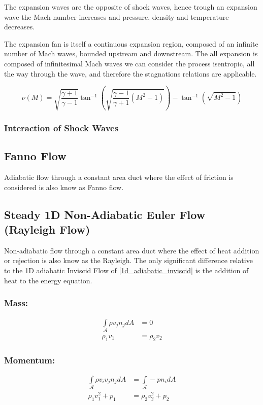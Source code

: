 The expansion waves are the opposite of shock waves, hence trough an expansion wave the Mach number increases and pressure, density and temperature decreases.

The expansion fan is itself a continuous expansion region, composed of an infinite number of Mach waves, bounded upstream and downstream.
The all expansion is composed of infinitesimal Mach waves we can consider the process isentropic, all the way through the wave, and therefore the stagnations relations are applicable.



\begin{equation}
\nu(M)=\sqrt{\frac{\gamma +1}{\gamma-1}} \tan^{-1}\left( \sqrt{\frac{\gamma -1}{\gamma+1}(M^2-1)} \right) -\tan^{-1} \left( \sqrt{M^2-1}\right)
\end{equation}
\subsubsection{Interaction of Shock Waves}



\newpage
\subsection{Fanno Flow}
Adiabatic flow through a constant area duct where the effect of friction is considered is also know as Fanno flow.

\newpage
\subsection{Steady 1D Non-Adiabatic Euler Flow (Rayleigh Flow)}
Non-adiabatic flow through a constant area duct where the effect of heat addition or rejection is also know as the
Rayleigh. The only significant difference relative to the 1D adiabatic Inviscid Flow of \ref{1d_adiabatic_inviscid} is the addition of heat to the energy equation.
\subsubsection*{Mass:}
 \begin{align}
    \int\limits_{\mathcal{A}} \rho v_j n_j dA &= 0 \\
    \rho_1 v_1  &= \rho_2 v_2
\end{align}


\subsubsection*{Momentum:}
\begin{align}
    \int\limits_{\mathcal{A}} \rho v_i v_j n_j dA &= \int\limits_{\mathcal{A}} - p n_i dA \\
    \rho_1 v^2_1 + p_1&=  \rho_2 v^2_2 + p_2
\end{align}

